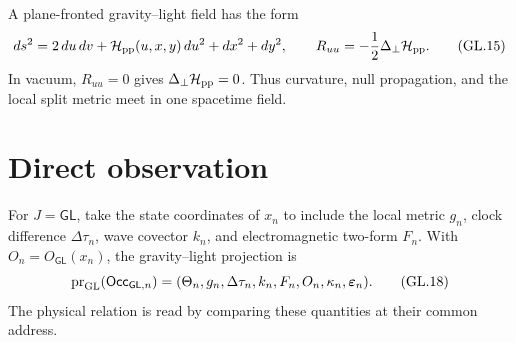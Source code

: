 \documentclass[10pt]{article}
\begin{document}
A plane-fronted gravity--light field has the form
\[
ds^2=2\,du\,dv+\mathcal H_{\rm pp}(u,x,y)\,du^2+dx^2+dy^2,
\qquad
R_{uu}=-\frac12\Delta_\perp\mathcal H_{\rm pp}.
\tag{GL.15}
\]
In vacuum, $R_{uu}=0$ gives $\Delta_\perp\mathcal H_{\rm pp}=0$. Thus curvature,
null propagation, and the local split metric meet in one spacetime field.

\section{Direct observation}


For $J=\mathsf{GL}$, take the state coordinates of $x_n$ to include the
local metric $g_n$, clock difference $\Delta\tau_n$, wave covector $k_n$, and
electromagnetic two-form $F_n$. With $O_n=O_{\mathsf{GL}}(x_n)$, the
gravity--light projection is
\[
\operatorname{pr}_{\rm GL}(\mathsf{Occ}_{\mathsf{GL},n})
=(\Theta_n,g_n,\Delta\tau_n,k_n,F_n,O_n,
\kappa_n,\boldsymbol\varepsilon_n).
\tag{GL.18}
\]
The physical relation is read by comparing these quantities at their common
address.
\end{document}
